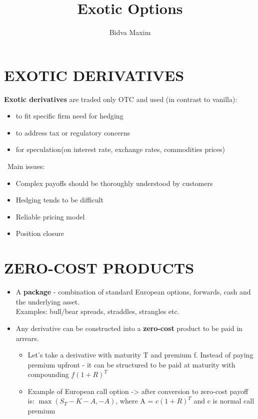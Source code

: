 \documentclass{article}
\title{Exotic Options}
\author{Bidva Maxim}
\begin{document}
\maketitle
\tableofcontents
\newpage
\section{EXOTIC DERIVATIVES}

{\bf Exotic derivatives} are traded only OTC and used (in contrast to vanilla):

\begin{multicols}
    \begin{itemize}
        \item to fit specific firm need for hedging
        \item to address tax or regulatory concerns
        \item for speculation(on interest rate, exchange rates, commodities prices)
    \end{itemize}
\end{multicols}
\
Main issues:
\begin{multicols}
    \begin{itemize}
        \item Complex payoffs should be thoroughly understood by customers
        \item Hedging tends to be difficult
        \item Reliable pricing model
        \item Position closure
    \end{itemize}
\end{multicols}
\section{ZERO-COST PRODUCTS}
\begin{itemize}

    \item A {\bf package} - combination of standard European options, forwards, cash and the underlying asset.\\ 
    Examples: bull/bear spreads, straddles, strangles etc.\\
    \item Any derivative can be constructed into a {\bf zero-cost} product to be paid in arrears.\

    \begin{itemize}
        \item Let's take a derivative with maturity T and premium f. Instead of paying premium upfront - it can be structured to be paid at maturity with compounding $f(1 + R)^T$
        \item Example of European call option -> after conversion to zero-cost payoff is: $\max(S_T - K - A, - A)$, where A = $c(1 + R)^T$ and c is normal call premium
    \end{itemize}

\end{itemize}
\end{document}
